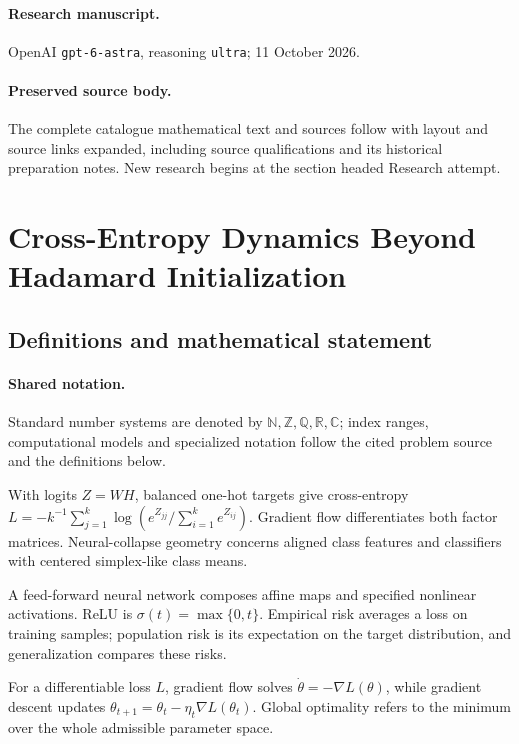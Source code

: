 \documentclass[11pt]{article}
\begin{document}
\paragraph{Research manuscript.} OpenAI \texttt{gpt-6-astra}, reasoning \texttt{ultra}; 11 October 2026.
\paragraph{Preserved source body.} The complete catalogue mathematical text and sources follow with layout and source links expanded, including source qualifications and its historical preparation notes. New research begins at the section headed Research attempt.

\section{Cross-Entropy Dynamics Beyond Hadamard Initialization}\label{statement}

\subsection{Definitions and mathematical statement}

\paragraph{Shared notation.}Standard number systems are denoted by $\mathbb N,\mathbb Z,\mathbb Q,\mathbb R,\mathbb C$; index ranges, computational models and specialized notation follow the cited problem source and the definitions below.


With logits $Z=WH$, balanced one-hot targets give cross-entropy $L=-k^{-1}\sum_{j=1}^k\log(e^{Z_{jj}}/\sum_{i=1}^ke^{Z_{ij}})$. Gradient flow differentiates both factor matrices. Neural-collapse geometry concerns aligned class features and classifiers with centered simplex-like class means.

A feed-forward neural network composes affine maps and specified nonlinear activations. ReLU is $\sigma(t)=\max\{0,t\}$. Empirical risk averages a loss on training samples; population risk is its expectation on the target distribution, and generalization compares these risks.

For a differentiable loss $L$, gradient flow solves $\dot\theta=-\nabla L(\theta)$, while gradient descent updates $\theta_{t+1}=\theta_t-\eta_t\nabla L(\theta_t)$. Global optimality refers to the minimum over the whole admissible parameter space.
\end{document}
